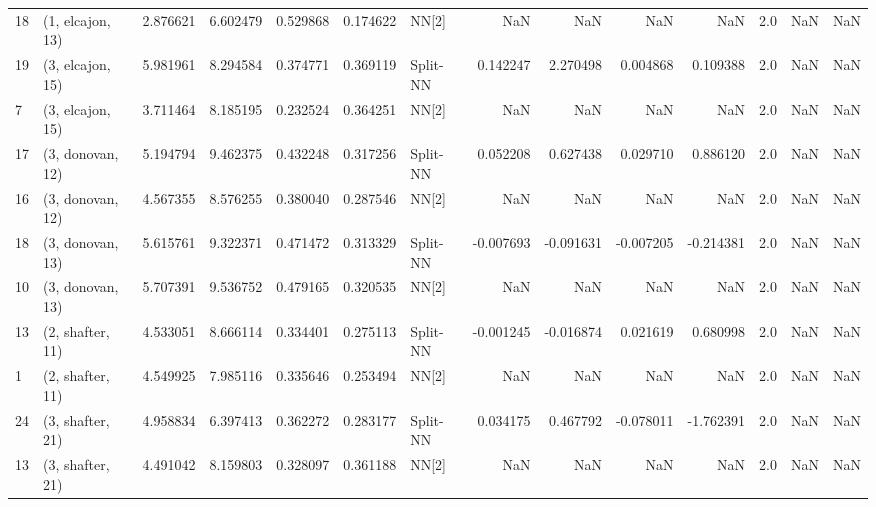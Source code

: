 \begin{tabular}{llrrrrlrrrrrrl}
18 &  (1, elcajon, 13) &  2.876621 &   6.602479 &   0.529868 &  0.174622 &       NN[2] &             NaN &           NaN &            NaN &          NaN &            2.0 &    NaN &              NaN \\
19 &  (3, elcajon, 15) &  5.981961 &   8.294584 &   0.374771 &  0.369119 &    Split-NN &        0.142247 &      2.270498 &       0.004868 &     0.109388 &            2.0 &    NaN &              NaN \\
7  &  (3, elcajon, 15) &  3.711464 &   8.185195 &   0.232524 &  0.364251 &       NN[2] &             NaN &           NaN &            NaN &          NaN &            2.0 &    NaN &              NaN \\
17 &  (3, donovan, 12) &  5.194794 &   9.462375 &   0.432248 &  0.317256 &    Split-NN &        0.052208 &      0.627438 &       0.029710 &     0.886120 &            2.0 &    NaN &              NaN \\
16 &  (3, donovan, 12) &  4.567355 &   8.576255 &   0.380040 &  0.287546 &       NN[2] &             NaN &           NaN &            NaN &          NaN &            2.0 &    NaN &              NaN \\
18 &  (3, donovan, 13) &  5.615761 &   9.322371 &   0.471472 &  0.313329 &    Split-NN &       -0.007693 &     -0.091631 &      -0.007205 &    -0.214381 &            2.0 &    NaN &              NaN \\
10 &  (3, donovan, 13) &  5.707391 &   9.536752 &   0.479165 &  0.320535 &       NN[2] &             NaN &           NaN &            NaN &          NaN &            2.0 &    NaN &              NaN \\
13 &  (2, shafter, 11) &  4.533051 &   8.666114 &   0.334401 &  0.275113 &    Split-NN &       -0.001245 &     -0.016874 &       0.021619 &     0.680998 &            2.0 &    NaN &              NaN \\
1  &  (2, shafter, 11) &  4.549925 &   7.985116 &   0.335646 &  0.253494 &       NN[2] &             NaN &           NaN &            NaN &          NaN &            2.0 &    NaN &              NaN \\
24 &  (3, shafter, 21) &  4.958834 &   6.397413 &   0.362272 &  0.283177 &    Split-NN &        0.034175 &      0.467792 &      -0.078011 &    -1.762391 &            2.0 &    NaN &              NaN \\
13 &  (3, shafter, 21) &  4.491042 &   8.159803 &   0.328097 &  0.361188 &       NN[2] &             NaN &           NaN &            NaN &          NaN &            2.0 &    NaN &              NaN \\

\end{tabular}

